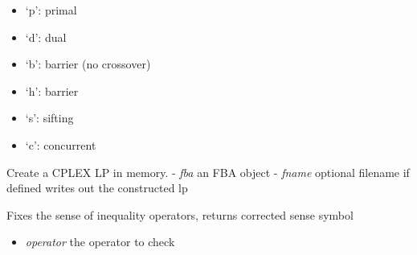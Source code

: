 \documentclass[a4paper,11pt,english]{sphinxmanual}
\begin{document}
\begin{fulllineitems}
\begin{itemize}
\begin{itemize}
\item {} 
`p': primal

\item {} 
`d': dual

\item {} 
`b': barrier (no crossover)

\item {} 
`h': barrier

\item {} 
`s': sifting

\item {} 
`c': concurrent

\end{itemize}

\end{itemize}

\end{fulllineitems}


\begin{fulllineitems}
\label{modules_doc:cbmpy.CBCPLEX.cplx_constructLPfromFBA}
Create a CPLEX LP in memory.
- \emph{fba} an FBA object
- \emph{fname} optional filename if defined writes out the constructed lp

\end{fulllineitems}


\begin{fulllineitems}
\label{modules_doc:cbmpy.CBCPLEX.cplx_fixConSense}
Fixes the sense of inequality operators, returns corrected sense symbol
\begin{itemize}
\item {} 
\emph{operator} the operator to check

\end{itemize}

\end{fulllineitems}

\end{document}
